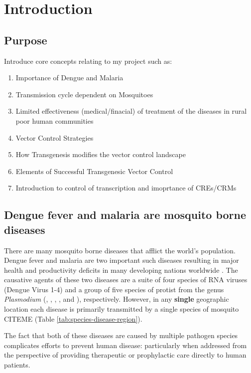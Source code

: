 \chapter{Introduction}

\section{Purpose}

Introduce core concepts relating to my project such as:

\begin{enumerate}
\item \chkBox Importance of Dengue and Malaria
\item \chkBoxX Transmission cycle dependent on Mosquitoes
\item \chkBox Limited effectiveness (medical/finacial) of treatment of the diseases in rural poor human communities
\item \chkBoxX Vector Control Strategies
\item \chkBoxX How Transgenesis modifies the vector control landscape
\item \chkBox Elements of Successful Transgenesic Vector Control
\item \chkBoxX Introduction to control of transcription and imoprtance of \glspl{CRE}/\glspl{CRM}
\end{enumerate}


\section{Dengue fever and malaria are mosquito borne diseases}

There are many mosquito borne diseases that afflict the world's population.
Dengue fever and malaria are two important such diseases resulting in major health and productivity deficits in many developing nations worldwide \CITEME.
The causative agents of these two diseases are a suite of four species of RNA viruses (Dengue Virus 1-4) and a group of five species of protist from the genus \textit{Plasmodium} (\Plf, \Pv, \Po, \Pm, and \Pk), respectively.
However, in any \textbf{single} geographic location each disease is primarily transmitted by a single species of mosquito \alert{CITEME} (Table \ref{tab:species-disease-region}). 



The fact that both of these diseases are caused by multiple pathogen species complicates efforts to prevent human disease: particularly when addressed from the perspective of providing therapeutic or prophylactic care directly to human patients.

